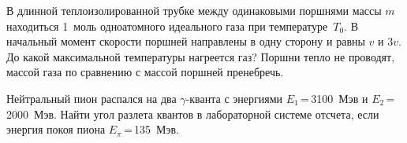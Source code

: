 \AddProb В длинной теплоизолированной трубке между одинаковыми поршнями 
массы $m$ находиться 1~моль одноатомного идеального газа при температуре~$T_0$. 
В начальный момент скорости поршней направлены в одну сторону и равны $v$ и 
$3v$. До какой максимальной температуры нагреется газ? Поршни тепло не 
проводят, массой газа по сравнению с массой поршней пренебречь.

\AddProb Нейтральный пион распался на два $\gamma$-кванта с энергиями $E_1$\,=\,3100~Мэв и $E_2$\,=\,2000~Мэв. 
Найти угол разлета квантов в лабораторной системе отсчета, если энергия покоя пиона $E_{\pi}$\,=\,135~Мэв.